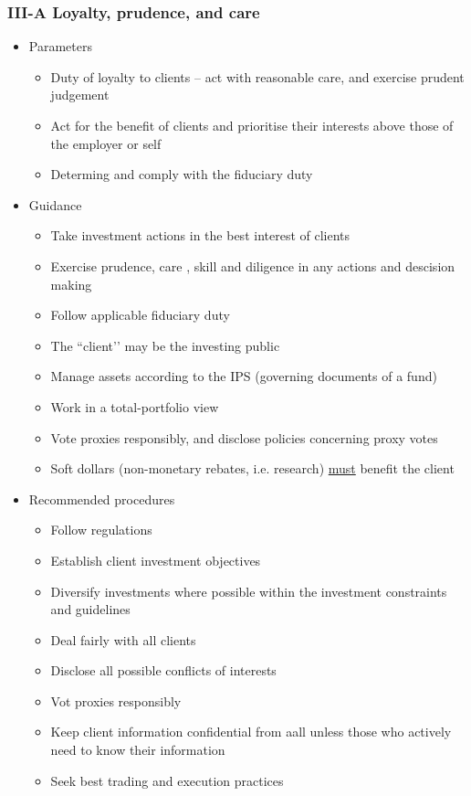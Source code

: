 \documentclass[../notes_compiled.tex]{subfiles}
\begin{document}
\subsubsection{III-A Loyalty, prudence, and care}
\begin{itemize}
\item Parameters
\begin{itemize}
\item Duty of loyalty to clients -- act with reasonable care, and exercise prudent judgement
\item Act for the benefit of clients and prioritise their interests above those of the employer or self
\item Determing and comply with the fiduciary duty
\end{itemize}
\item Guidance
\begin{itemize}
\item Take investment actions in the best interest of clients
\item Exercise prudence, care , skill and diligence in any actions and descision making
\item Follow applicable fiduciary duty
\item The ``client’’ may be the investing public
\item Manage assets according to the IPS (governing documents of a fund)
\item Work in a total-portfolio view
\item Vote proxies responsibly, and disclose policies concerning proxy votes
\item Soft dollars (non-monetary rebates, i.e. research) \underline{must} benefit the client
\end{itemize}
\item Recommended procedures
\begin{itemize}
\item Follow regulations
\item Establish client investment objectives
\item Diversify investments where possible within the investment constraints and guidelines
\item Deal fairly with all clients
\item Disclose all possible conflicts of interests
\item Vot proxies responsibly
\item Keep client information confidential from aall unless those who actively need to know their information
\item Seek best trading and execution practices
\end{itemize}
\end{itemize}
\end{document}
